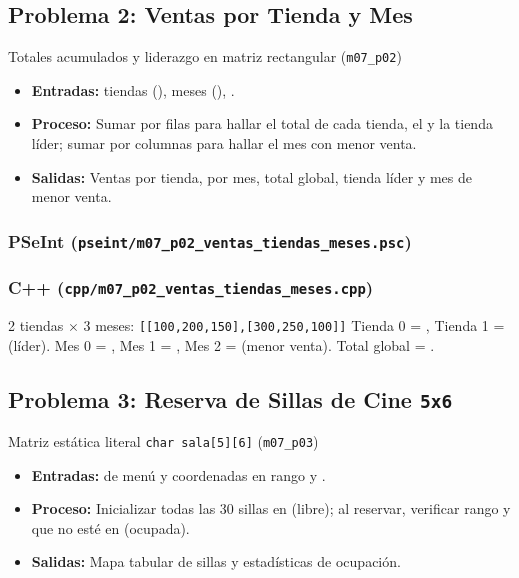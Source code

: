 \documentclass[11pt,letterpaper]{article}
\begin{document}
\subsection{Problema 2: Ventas por Tienda y Mes}
\begin{analisis}{Totales acumulados y liderazgo en matriz rectangular (\texttt{m07\_p02})}
\begin{itemize}
  \item \textbf{Entradas:}  tiendas (),  meses (), .
  \item \textbf{Proceso:} Sumar por filas para hallar el total de cada tienda, el  y la tienda líder; sumar por columnas para hallar el mes con menor venta.
  \item \textbf{Salidas:} Ventas por tienda, por mes, total global, tienda líder y mes de menor venta.
\end{itemize}
\end{analisis}

\subsubsection*{PSeInt (\texttt{pseint/m07\_p02\_ventas\_tiendas\_meses.psc})}


\subsubsection*{C++ (\texttt{cpp/m07\_p02\_ventas\_tiendas\_meses.cpp})}


\begin{pruebaescritorio}{2 tiendas $\times$ 3 meses: \texttt{[[100,200,150],[300,250,100]]}}
Tienda 0 = , Tienda 1 =  (líder). Mes 0 = , Mes 1 = , Mes 2 =  (menor venta). Total global = .
\end{pruebaescritorio}

\subsection{Problema 3: Reserva de Sillas de Cine \texttt{5x6}}
\begin{analisis}{Matriz estática literal \texttt{char sala[5][6]} (\texttt{m07\_p03})}
\begin{itemize}
  \item \textbf{Entradas:}  de menú y coordenadas  en rango  y .
  \item \textbf{Proceso:} Inicializar todas las 30 sillas en  (libre); al reservar, verificar rango y que no esté en  (ocupada).
  \item \textbf{Salidas:} Mapa tabular de sillas y estadísticas de ocupación.
\end{itemize}
\end{analisis}
\end{document}
